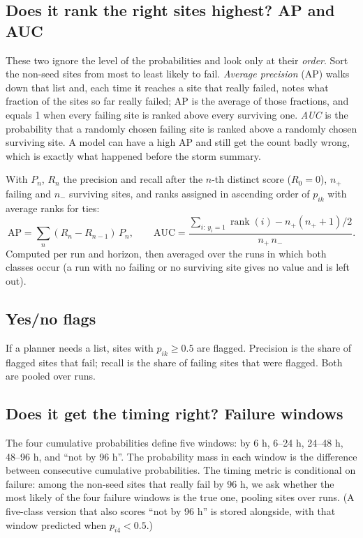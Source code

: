 \documentclass[11pt]{article}
\begin{document}
\subsection{Does it rank the right sites highest? AP and AUC}\label{sub:rank}

These two ignore the level of the probabilities and look only at their \emph{order}. Sort the non-seed sites from most to least likely to fail. \emph{Average precision} (AP) walks down that list and, each time it reaches a site that really failed, notes what fraction of the sites so far really failed; AP is the average of those fractions, and equals 1 when every failing site is ranked above every surviving one. \emph{AUC} is the probability that a randomly chosen failing site is ranked above a randomly chosen surviving site. A model can have a high AP and still get the count badly wrong, which is exactly what happened before the storm summary.

\begin{maths}
With $P_n$, $R_n$ the precision and recall after the $n$-th distinct score ($R_0=0$), $n_+$ failing and $n_-$ surviving sites, and ranks assigned in ascending order of $p_{ik}$ with average ranks for ties:
\[
\mathrm{AP}=\sum_n (R_n-R_{n-1})\,P_n,\qquad
\mathrm{AUC}=\frac{\sum_{i:\,y_i=1}\operatorname{rank}(i)-n_+(n_++1)/2}{n_+\,n_-}.
\]
Computed per run and horizon, then averaged over the runs in which both classes occur (a run with no failing or no surviving site gives no value and is left out).
\end{maths}

\subsection{Yes/no flags}

If a planner needs a list, sites with $p_{ik}\ge0.5$ are flagged. Precision is the share of flagged sites that fail; recall is the share of failing sites that were flagged. Both are pooled over runs.

\subsection{Does it get the timing right? Failure windows}\label{sub:window}

The four cumulative probabilities define five windows: by 6 h, 6--24 h, 24--48 h, 48--96 h, and ``not by 96 h''. The probability mass in each window is the difference between consecutive cumulative probabilities. The timing metric is conditional on failure: among the non-seed sites that really fail by 96 h, we ask whether the most likely of the four failure windows is the true one, pooling sites over runs. (A five-class version that also scores ``not by 96 h'' is stored alongside, with that window predicted when $p_{i4}<0.5$.)
\end{document}
